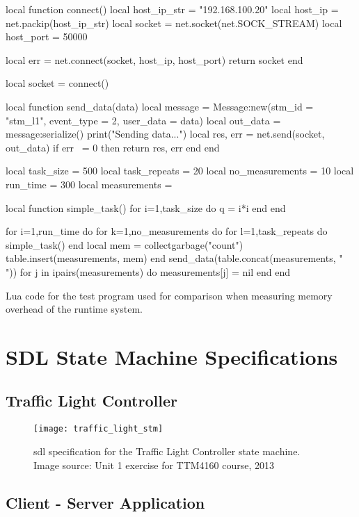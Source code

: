 \begin{appendices}
\begin{listing}[htp]
\begin{luacode}
local function connect()
	local host_ip_str = "192.168.100.20"
	local host_ip = net.packip(host_ip_str)
	local socket = net.socket(net.SOCK_STREAM)
	local host_port = 50000

	local err = net.connect(socket, host_ip, host_port)
	return socket
end

local socket = connect()

local function send_data(data)
	local message = Message:new({stm_id = "stm_l1", event_type = 2, user_data = data})
	local out_data = message:serialize()
	print("Sending data...")
	local res, err = net.send(socket, out_data)
	if err ~= 0 then
		return res, err
	end
end

local task_size = 500
local task_repeats = 20
local no_measurements = 10
local run_time = 300
local measurements = {}

local function simple_task()
	for i=1,task_size do
		q = i*i
	end
end

for i=1,run_time do
	for k=1,no_measurements do
		for l=1,task_repeats do
			simple_task()
		end
		local mem = collectgarbage("count")
		table.insert(measurements, mem)
	end
	send_data(table.concat(measurements, " "))
	for j in ipairs(measurements) do
		measurements[j] = nil
	end
end
\end{luacode}
	\caption{Lua code for the test program used for comparison when measuring memory overhead of the runtime system.}
	\label{code:memory_overhead_test}
\end{listing}

\FloatBarrier
\chapter{SDL State Machine Specifications}
\label{app:stm_sdl}

\section{Traffic Light Controller}
\label{uml:traffic_light}

\begin{figure}[htp]
	\centering
	\texttt{[image: traffic\_light\_stm]}
	\caption[SDL specification for Traffic Light Controller]{\gls{sdl} specification for the Traffic Light Controller state machine. Image source: Unit 1 exercise for TTM4160 course, 2013}
	\label{fig:traffic_light_sdl}
\end{figure}

\FloatBarrier
\section{Client - Server Application}
\label{uml:client_server}


\end{appendices}
